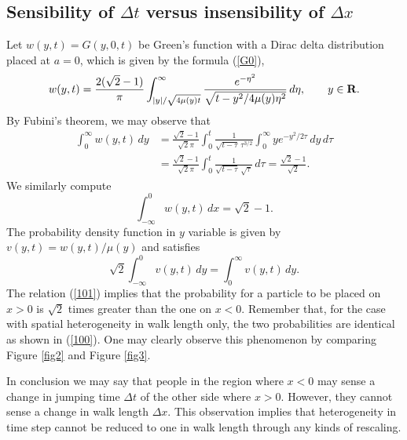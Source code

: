 \documentclass[11pt]{amsart}
\def\R{{\bf R}}
\def\R{{\bf R}}
\begin{document}
\subsection{Sensibility of $\Delta t$ versus insensibility of $\Delta x$}\label{sect.Answer2}
Let $w(y,t)=G(y,0,t)$ be Green's function with a Dirac delta distribution placed at $a=0$, which is given by the formula (\ref{G0}),
\begin{equation*}
w(y,t)=\frac{2(\sqrt{2}-1)}{\pi} \int_{|y|/\sqrt{4\mu(y)t}}^\infty \frac{e^{-\eta^2}}{\sqrt{t-y^2/4\mu(y)\eta^2}}\,d\eta,\qquad y\in\R.
\end{equation*}
By Fubini's theorem, we may observe that
\begin{align*}
\int_0^\infty w(y,t)\,dy &= \frac{\sqrt{2}-1}{\sqrt{2} \pi} \int_0^t \frac{1}{\sqrt{t-\tau} \,\tau^{3/2}} \int_0^\infty y e^{-y^2/2\tau} \,dy \,d\tau \\
&= \frac{\sqrt{2}-1}{\sqrt{2} \pi} \int_0^t \frac{1}{\sqrt{t-\tau} \,\sqrt{\tau}} \,d\tau = \frac{\sqrt{2} - 1}{\sqrt{2}}.
\end{align*}
We similarly compute
$$
\int_{-\infty}^0 w(y,t)\,dx = \sqrt{2} - 1.
$$
The probability density function in $y$ variable is given by $v(y,t)=w(y,t)/\mu(y)$ and satisfies
\begin{equation}\label{101}
\sqrt{2}\int_{-\infty}^0 v(y,t)\,dy =\int_0^\infty v(y,t)\,dy.
\end{equation}
The relation (\ref{101}) implies that the probability for a particle to be placed on $x>0$ is $\sqrt{2}$ times greater than the one on $x<0$. Remember that, for the case with spatial heterogeneity in walk length only, the two probabilities are identical as shown in (\ref{100}). One may clearly observe this phenomenon by comparing Figure \ref{fig2} and Figure \ref{fig3}.

In conclusion we may say that people in the region where $x<0$ may sense a change in jumping time $\Delta t$ of the other side where $x>0$. However, they cannot sense a change in walk length $\Delta x$. This observation implies that heterogeneity in time step cannot be reduced to one in walk length through any kinds of rescaling.
\end{document}
